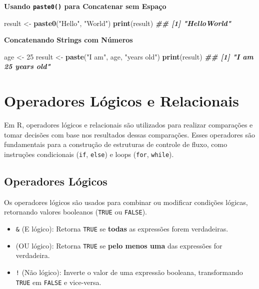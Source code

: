 \documentclass[
]{book}
\newenvironment{Shaded}{\begin{snugshade}}{\end{snugshade}}
\newcommand{\DecValTok}[1]{\textcolor[rgb]{0.00,0.00,0.81}{#1}}
\newcommand{\DocumentationTok}[1]{\textcolor[rgb]{0.56,0.35,0.01}{\textbf{\textit{#1}}}}
\newcommand{\FunctionTok}[1]{\textcolor[rgb]{0.13,0.29,0.53}{\textbf{#1}}}
\newcommand{\NormalTok}[1]{#1}
\newcommand{\OtherTok}[1]{\textcolor[rgb]{0.56,0.35,0.01}{#1}}
\newcommand{\StringTok}[1]{\textcolor[rgb]{0.31,0.60,0.02}{#1}}
\begin{document}
\textbf{Usando \texttt{paste0()} para Concatenar sem Espaço}

\begin{Shaded}
\begin{Highlighting}[]
\NormalTok{result }\OtherTok{\textless{}{-}} \FunctionTok{paste0}\NormalTok{(}\StringTok{"Hello"}\NormalTok{, }\StringTok{"World"}\NormalTok{)}
\FunctionTok{print}\NormalTok{(result)}
\DocumentationTok{\#\# [1] "HelloWorld"}
\end{Highlighting}
\end{Shaded}

\textbf{Concatenando Strings com Números}

\begin{Shaded}
\begin{Highlighting}[]
\NormalTok{age }\OtherTok{\textless{}{-}} \DecValTok{25}
\NormalTok{result }\OtherTok{\textless{}{-}} \FunctionTok{paste}\NormalTok{(}\StringTok{"I am"}\NormalTok{, age, }\StringTok{"years old"}\NormalTok{)}
\FunctionTok{print}\NormalTok{(result)}
\DocumentationTok{\#\# [1] "I am 25 years old"}
\end{Highlighting}
\end{Shaded}

\section{Operadores Lógicos e Relacionais}\label{operadores-luxf3gicos-e-relacionais}

Em R, operadores lógicos e relacionais são utilizados para realizar
comparações e tomar decisões com base nos resultados dessas comparações.
Esses operadores são fundamentais para a construção de estruturas de
controle de fluxo, como instruções condicionais (\texttt{if}, \texttt{else}) e loops
(\texttt{for}, \texttt{while}).

\subsection{Operadores Lógicos}\label{operadores-luxf3gicos}

Os operadores lógicos são usados para combinar ou modificar condições
lógicas, retornando valores booleanos (\texttt{TRUE} ou \texttt{FALSE}).

\begin{itemize}
\item
  \texttt{\&} (E lógico): Retorna \texttt{TRUE} se \textbf{todas} as expressões forem
  verdadeiras.
\item
  \texttt{\textbar{}} (OU lógico): Retorna \texttt{TRUE} se \textbf{pelo menos uma} das expressões
  for verdadeira.
\item
  \texttt{!} (Não lógico): Inverte o valor de uma expressão booleana,
  transformando \texttt{TRUE} em \texttt{FALSE} e vice-versa.
\end{itemize}
\end{document}
